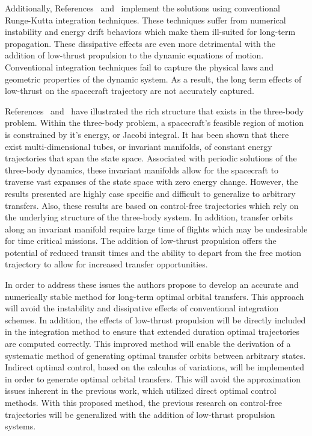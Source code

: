 \documentclass[letterpaper, preprint, paper,11pt]{AAS}	%
\begin{document}
Additionally, References~ and~ implement the solutions using conventional Runge-Kutta integration techniques.
These techniques suffer from numerical instability and energy drift behaviors which make them ill-suited for long-term propagation.
These dissipative effects are even more detrimental with the addition of low-thrust propulsion to the dynamic equations of motion.
Conventional integration techniques fail to capture the physical laws and geometric properties of the dynamic system.
As a result, the long term effects of low-thrust on the spacecraft trajectory are not accurately captured. 

References~ and~ have illustrated the rich structure that exists in the three-body problem.
Within the three-body problem, a spacecraft's feasible region of motion is constrained by it's energy, or Jacobi integral. 
It has been shown that there exist multi-dimensional tubes, or invariant manifolds, of constant energy trajectories that span the state space. 
Associated with periodic solutions of the three-body dynamics, these invariant manifolds allow for the spacecraft to traverse vast expanses of the state space with zero energy change. 
However, the results presented are highly case specific and difficult to generalize to arbitrary transfers.
Also, these results are based on control-free trajectories which rely on the underlying structure of the three-body system.
In addition, transfer orbits along an invariant manifold require large time of flights which may be undesirable for time critical missions.
The addition of low-thrust propulsion offers the potential of reduced transit times and the ability to depart from the free motion trajectory to allow for increased transfer opportunities. 

In order to address these issues the authors propose to develop an accurate and numerically stable method for long-term optimal orbital transfers.
This approach will avoid the instability and dissipative effects of conventional integration schemes.
In addition, the effects of low-thrust propulsion will be directly included in the integration method to ensure that extended duration optimal trajectories are computed correctly.
This improved method will enable the derivation of a systematic method of generating optimal transfer orbits between arbitrary states.
Indirect optimal control, based on the calculus of variations, will be implemented in order to generate optimal orbital transfers.
This will avoid the approximation issues inherent in the previous work, which utilized direct optimal control methods.
With this proposed method, the previous research on control-free trajectories will be generalized with the addition of low-thrust propulsion systems.
\end{document}
